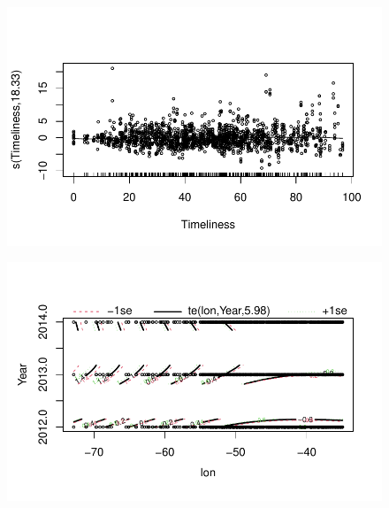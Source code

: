 \documentclass[
  letterpaper,
  DIV=11,
  numbers=noendperiod]{scrartcl}
\begin{document}
\begin{figure}[H]

{\centering \includegraphics{Group34Coursework_files/figure-pdf/unnamed-chunk-10-9.pdf}

}

\end{figure}

\begin{figure}[H]

{\centering \includegraphics{Group34Coursework_files/figure-pdf/unnamed-chunk-10-10.pdf}

}

\end{figure}
\end{document}
